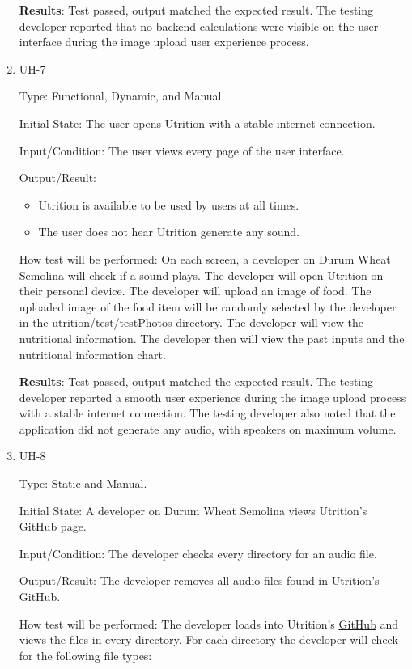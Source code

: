\documentclass[12pt, titlepage]{article}
\begin{document}
\begin{enumerate}
		\textbf{Results}: Test passed, output matched the expected result. The testing developer reported that no backend calculations were visible on the user interface during the image upload user experience process.
		
		\item{UH-7}
		
		Type: Functional, Dynamic, and Manual.
		
		Initial State: The user opens Utrition with a stable internet connection.
		
		Input/Condition: The user views every page of the user interface.
		
		Output/Result: 
		\begin{itemize}
			\item Utrition is available to be used by users at all times.
			\item The user does not hear Utrition generate any sound.
		\end{itemize}
		
		How test will be performed: On each screen, a developer on Durum Wheat Semolina will check if a sound plays. The developer will open Utrition on their personal device. The developer will upload an image of food. The uploaded image of the food item will be randomly selected by the developer in the utrition/test/testPhotos directory. The developer will view the nutritional information. The developer then will view the past inputs and the nutritional information chart.
		
		\textbf{Results}: Test passed, output matched the expected result. The testing developer reported a smooth user experience during the image upload process with a stable internet connection. The testing developer also noted that the application did not generate any audio, with speakers on maximum volume.
		
		\item{UH-8}
		
		Type: Static and Manual.
		
		Initial State: A developer on Durum Wheat Semolina views Utrition’s GitHub page. 
		
		Input/Condition: The developer checks every directory for an audio file.
		
		Output/Result: The developer removes all audio files found in Utrition’s GitHub.
		
		How test will be performed: The developer loads into Utrition’s \href{https://github.com/jeff-rey-wang/utrition/}{GitHub} and views the files in every directory. For each directory the developer will check for the following file types:
		

\end{enumerate}
\end{document}
